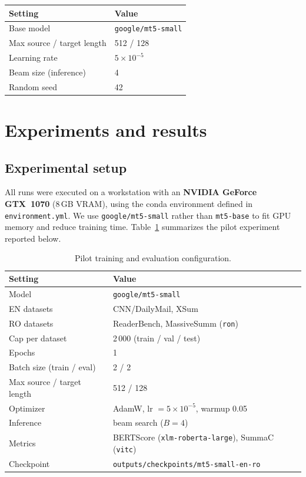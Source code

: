 \documentclass[11pt,a4paper]{article}
\begin{document}
\begin{center}
\small
\begin{tabular}{@{}ll@{}}
  \toprule
  Setting & Value \\
  \midrule
  Base model & \texttt{google/mt5-small} \\
  Max source / target length & 512 / 128 \\
  Learning rate & $5 \times 10^{-5}$ \\
  Beam size (inference) & 4 \\
  Random seed & 42 \\
  \bottomrule
\end{tabular}
\end{center}

\section{Experiments and results}

\subsection{Experimental setup}

All runs were executed on a workstation with an \textbf{NVIDIA GeForce GTX~1070} (8\,GB VRAM), using the conda environment defined in \texttt{environment.yml}.
We use \texttt{google/mt5-small} rather than \texttt{mt5-base} to fit GPU memory and reduce training time.
Table~\ref{tab:exp-setup} summarizes the pilot experiment reported below.

\begin{table}[h]
  \centering
  \small
  \caption{Pilot training and evaluation configuration.}
  \label{tab:exp-setup}
  \begin{tabularx}{\textwidth}{@{}l X@{}}
    \toprule
    Setting & Value \\
    \midrule
    Model & \texttt{google/mt5-small} \\
    EN datasets & CNN/DailyMail, XSum \\
    RO datasets & ReaderBench, MassiveSumm (\texttt{ron}) \\
    Cap per dataset & 2\,000 (train / val / test) \\
    Epochs & 1 \\
    Batch size (train / eval) & 2 / 2 \\
    Max source / target length & 512 / 128 \\
    Optimizer & AdamW, lr $=5\times10^{-5}$, warmup 0.05 \\
    Inference & beam search ($B=4$) \\
    Metrics & BERTScore (\texttt{xlm-roberta-large}), SummaC (\texttt{vitc}) \\
    Checkpoint & \texttt{outputs/checkpoints/mt5-small-en-ro} \\
    \bottomrule
  \end{tabularx}
\end{table}
\end{document}
